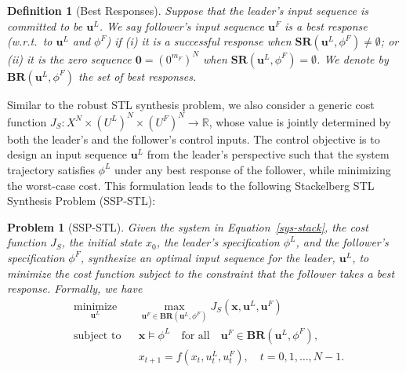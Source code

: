 \documentclass[letterpaper, 10 pt, conference]{ieeeconf}
\newtheorem{definition}{\bf Definition}
\newtheorem{problem}{\bf Problem}
\begin{document}
\begin{definition}[Best Responses]\label{def-best-res}
Suppose that the leader's input sequence is committed to be  $\mathbf{u}^L$. 
We say  follower's input sequence $\mathbf{u}^F$ is a \emph{best response} (w.r.t.\ to $\mathbf{u}^L$ and $\phi^F$) if 
(i) it is a successful response when $\mathbf{SR}(\mathbf{u}^L,{\phi^F})\neq \emptyset$; 
or 
(ii) it is the zero sequence $\mathbf{0}=(0^{m_F})^N$ when $\mathbf{SR}(\mathbf{u}^L,{\phi^F})= \emptyset$. 
We denote by $\mathbf{BR}(\mathbf{u}^L,\phi^F)$ the set of best responses.
\end{definition}


Similar to the robust STL synthesis problem, we also consider a generic cost function 
$J_S: X^N \times (U^L)^N \times (U^F)^N \to \mathbb{R}$, whose value is jointly determined by both the leader's and the follower's control inputs. The control objective is to design an input sequence $\mathbf{u}^L$ from the leader's perspective such that the system trajectory satisfies $\phi^L$ under any best response of the follower, while minimizing the worst-case cost. This formulation leads to the following Stackelberg STL Synthesis Problem (SSP-STL):

\begin{problem}[SSP-STL]\label{SSP-STL}
Given the system in Equation~\eqref{sys-stack}, the cost function $J_S$, the initial state $x_0$, the leader's specification $\phi^L$, and the follower's specification $\phi^F$, synthesize an optimal input sequence for the leader, $\mathbf{u}^L$, to minimize the cost function subject to the constraint that the follower takes a best response. Formally, we have
\[
\begin{aligned}
& \underset{\mathbf{u}^L}{\text{minimize}} & & \max_{\mathbf{u}^F \in \mathbf{BR}(\mathbf{u}^L, \phi^F)} J_S(\mathbf{x}, \mathbf{u}^L, \mathbf{u}^F) \\
& \text{subject to} & & \mathbf{x} \models \phi^L \quad \text{for all} \quad \mathbf{u}^F \in \mathbf{BR}(\mathbf{u}^L, \phi^F), \\
& & & x_{t+1} = f(x_t, u^L_t, u^F_t), \quad t = 0, 1, \dots, N-1.
\end{aligned}
\]\medskip
\end{problem}
\end{document}
